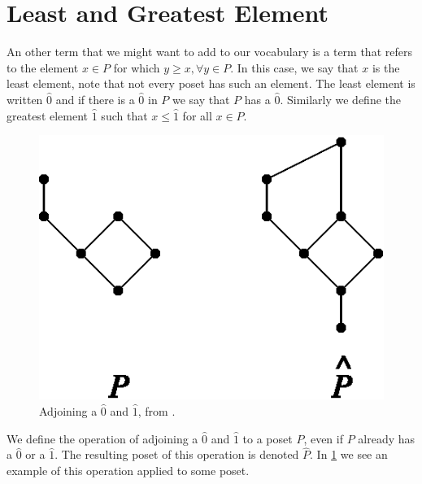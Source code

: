 \section{Least and Greatest Element}
\label{tree:poset:leastandgreatest}

An other term that we might want to add to our vocabulary is a term that refers
to the element $x \in P$ for which $y \geq x, \forall y \in P$. In this case,
we say that $x$ is the least element, note that not every poset has such an
element. The least element is written $\hat{0}$ and if there is a $\hat{0}$ in
$P$ we say that $P$ has a $\hat{0}$. Similarly we define the greatest element
$\hat{1}$ such that $x \leq \hat{1}$ for all $x \in P$.

\begin{figure}
	\centering
	\includegraphics[height=0.2\textheight]{fig/stanley/3-3}
	\caption{\label{fig:stanley:3-3} Adjoining a $\hat{0}$ and $\hat{1}$, from
\citet*{Stanley:2011:ECV:2124415}.}
\end{figure}

We define the operation of adjoining a $\hat{0}$ and $\hat{1}$ to a poset $P$,
even if $P$ already has a $\hat{0}$ or a $\hat{1}$. The resulting poset of this
operation is denoted $\hat{P}$. In \ref{fig:stanley:3-3} we see an example of
this operation applied to some poset.



